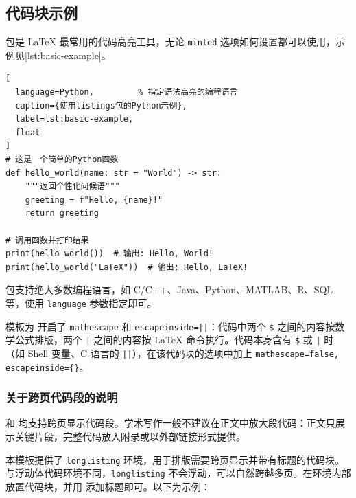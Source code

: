 \subsection{代码块示例}

 包是 \LaTeX{} 最常用的代码高亮工具，无论 \texttt{minted} 选项如何设置都可以使用，示例见\cref{lst:basic-example}。

\begin{lstlisting}[
  language=Python,         % 指定语法高亮的编程语言
  caption={使用listings包的Python示例},
  label=lst:basic-example,
  float
]
# 这是一个简单的Python函数
def hello_world(name: str = "World") -> str:
    """返回个性化问候语"""
    greeting = f"Hello, {name}!"
    return greeting

# 调用函数并打印结果
print(hello_world())  # 输出: Hello, World!
print(hello_world("LaTeX"))  # 输出: Hello, LaTeX!
\end{lstlisting}

 包支持绝大多数编程语言，如 C/C++、Java、Python、MATLAB、R、SQL 等，使用 \texttt{language} 参数指定即可。

模板为  开启了 \texttt{mathescape} 和 \texttt{escapeinside=||}：代码中两个 \verb|$| 之间的内容按数学公式排版，两个 \verb+|+ 之间的内容按 \LaTeX{} 命令执行。代码本身含有 \verb|$| 或 \verb+|+ 时（如 Shell 变量、C 语言的 \verb+||+），在该代码块的选项中加上 \verb|mathescape=false, escapeinside={}|。

\subsubsection{关于跨页代码段的说明}
 和  均支持跨页显示代码段。学术写作一般不建议在正文中放大段代码：正文只展示关键片段，完整代码放入附录或以外部链接形式提供。

本模板提供了 \texttt{longlisting} 环境，用于排版需要跨页显示并带有标题的代码块。与浮动体代码环境不同，\texttt{longlisting} 不会浮动，可以自然跨越多页。在环境内部放置代码块，并用  添加标题即可。以下为示例：

